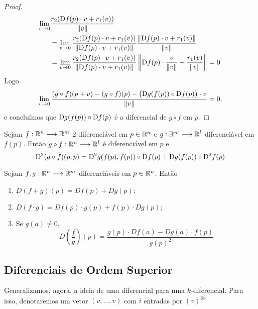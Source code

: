 \begin{proof}
\begin{align*}
	\lim_{v \rightarrow 0} &\frac{r_2(\mathrm{D} f(p) \cdot v + r_1(v))}{\left\Vert{v}\right\Vert} \\
		&= \lim_{v \rightarrow 0} \frac{r_2(\mathrm{D} f(p) \cdot v + r_1(v))}{\left\Vert{\mathrm{D}f(p) \cdot v + r_1(v)}\right\Vert} \frac{\left\Vert{\mathrm{D}f(p) \cdot v + r_1(v)}\right\Vert}{\left\Vert{v}\right\Vert}\\
		&= \lim_{v \rightarrow 0} \frac{r_2(\mathrm{D} f(p) \cdot v + r_1(v))}{\left\Vert{\mathrm{D}f(p) \cdot v + r_1(v)}\right\Vert} \left\Vert{\mathrm{D}f(p) \cdot \frac{v}{\left\Vert{v}\right\Vert}+ \frac{r_1(v)}{\left\Vert{v}\right\Vert}}\right\Vert = 0.
	\end{align*}
Logo
	\begin{equation*}
	\lim_{v \rightarrow 0} \frac{(g \circ f)(p+v) - (g \circ f)(p) - \big(\mathrm{D} g(f(p)) \circ \mathrm{D} f(p)\big) \cdot v}{\left\Vert{v}\right\Vert} = 0,
	\end{equation*}
e concluímos que $\mathrm{D} g(f(p)) \circ \mathrm{D} f(p)$ é a diferencial de $g \circ f$ em $p$.
\end{proof}


\begin{prop}
Sejam $f: \mathbb{R}^n \longrightarrow \mathbb{R}^m$ $2$-diferenciável em $p \in \mathbb{R}^n$ e $g: \mathbb{R}^m \longrightarrow \mathbb{R}^l$ diferenciável em $f(p)$. Então $g \circ f: \mathbb{R}^n \longrightarrow \mathbb{R}^l$ é diferenciável em $p$ e
	\begin{equation*}
	\mathrm{D}^2 (g \circ f)(p,p) = \mathrm{D}^2 g(f(p),f(p)) \circ \mathrm{D} f(p) + \mathrm{D} g(f(p)) \circ \mathrm{D}^2 f(p)
	\end{equation*}
\end{prop}




\begin{prop}
	Sejam $f,g: \mathbb{R}^n \longrightarrow \mathbb{R}^m$ diferenciáveis em $p \in \mathbb{R}^n$. Então
	\begin{enumerate}
	\item $D (f+g)(p) = D f(p) + D g(p);$
	\item $D (f \cdot g) = D f(p) \cdot g(p) + f(p) \cdot D g(p);$
	\item Se $g(a) \neq 0$,
	\begin{equation*}
	D \left(\frac{f}{g}\right) (p) = \frac{g(p) \cdot D f(a) - D g (a) \cdot f(p)}{g(p)^2}
	\end{equation*}
	\end{enumerate}
\end{prop}



\subsection{Diferenciais de Ordem Superior}

Generalizamos, agora, a ideia de uma diferencial para uma $k$-diferencial. Para isso, denotaremos um vetor $(v,\ldots,v)$ com $i$ entradas por $(v)^{\otimes i}$

